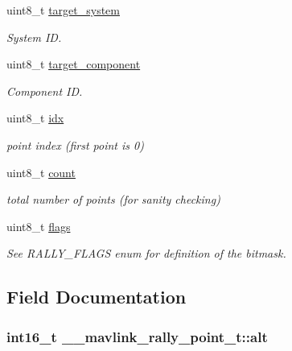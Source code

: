 \begin{DoxyCompactItemize}
uint8\+\_\+t \hyperlink{struct____mavlink__rally__point__t_a1517222437188e579031c9ac9adb9376}{target\+\_\+system}
\begin{DoxyCompactList}\small\item\em System I\+D. \end{DoxyCompactList}\item 
uint8\+\_\+t \hyperlink{struct____mavlink__rally__point__t_a5e2e50649ed29405428130dcc2ff2600}{target\+\_\+component}
\begin{DoxyCompactList}\small\item\em Component I\+D. \end{DoxyCompactList}\item 
uint8\+\_\+t \hyperlink{struct____mavlink__rally__point__t_a44e656a447965ea917a6d79001cd1b07}{idx}
\begin{DoxyCompactList}\small\item\em point index (first point is 0) \end{DoxyCompactList}\item 
uint8\+\_\+t \hyperlink{struct____mavlink__rally__point__t_adf8b2c2fb0fff4d7b871638d7131d9a8}{count}
\begin{DoxyCompactList}\small\item\em total number of points (for sanity checking) \end{DoxyCompactList}\item 
uint8\+\_\+t \hyperlink{struct____mavlink__rally__point__t_a263b666b89c93d236a92656eb650cd54}{flags}
\begin{DoxyCompactList}\small\item\em See R\+A\+L\+L\+Y\+\_\+\+F\+L\+A\+G\+S enum for definition of the bitmask. \end{DoxyCompactList}\end{DoxyCompactItemize}


\subsection{Field Documentation}
\hypertarget{struct____mavlink__rally__point__t_a674a401df2e48e64375f20555b631632}{
\subsubsection[{alt}]{\setlength{\rightskip}{0pt plus 5cm}int16\+\_\+t \+\_\+\+\_\+mavlink\+\_\+rally\+\_\+point\+\_\+t\+::alt}}\label{struct____mavlink__rally__point__t_a674a401df2e48e64375f20555b631632}


